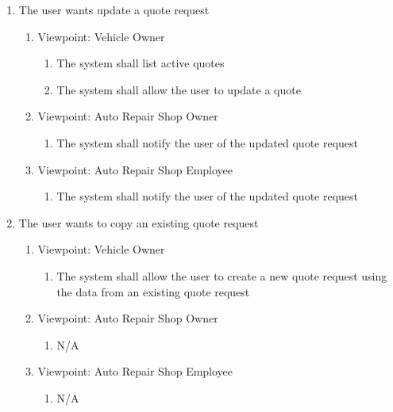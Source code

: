 \documentclass[12pt]{article}
\begin{document}
\begin{enumerate}[resume*=business_events]
	\item The user wants update a quote request
	      \begin{enumerate}[VP\arabic*.]
		      \item Viewpoint: Vehicle Owner
		            \begin{enumerate}
			            \item The system shall list active quotes
			            \item The system shall allow the user to update a quote
		            \end{enumerate}
		      \item Viewpoint: Auto Repair Shop Owner
		            \begin{enumerate}
			            \item The system shall notify the user of the updated quote request
		            \end{enumerate}
		      \item Viewpoint: Auto Repair Shop Employee
		            \begin{enumerate}
			            \item The system shall notify the user of the updated quote request
		            \end{enumerate}
	      \end{enumerate}

	\item The user wants to copy an existing quote request
	      \begin{enumerate}[VP\arabic*.]
		      \item Viewpoint: Vehicle Owner
		            \begin{enumerate}
			            \item The system shall allow the user to create a new quote request using the data from an existing quote
			                  request
		            \end{enumerate}
		      \item Viewpoint: Auto Repair Shop Owner
		            \begin{enumerate}
			            \item[] N/A
		            \end{enumerate}
		      \item Viewpoint: Auto Repair Shop Employee
		            \begin{enumerate}
			            \item[] N/A
		            \end{enumerate}
	      \end{enumerate}


\end{enumerate}
\end{document}
